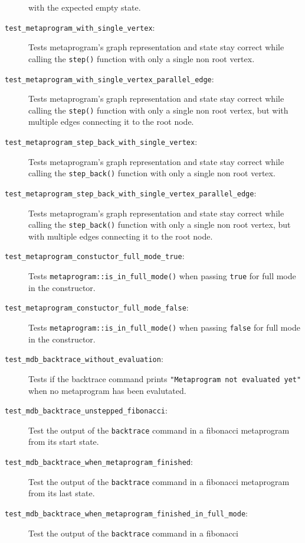 \begin{description}
        with the expected empty state.
    \item[\texttt{test\_metaprogram\_with\_single\_vertex}:]
        Tests metaprogram's graph representation and state stay correct while
        calling the \texttt{step()} function with only a single non root
        vertex.
    \item[\texttt{test\_metaprogram\_with\_single\_vertex\_parallel\_edge}:]
        Tests metaprogram's graph representation and state stay correct while
        calling the \texttt{step()} function with only a single non root
        vertex, but with multiple edges connecting it to the root node.
    \item[\texttt{test\_metaprogram\_step\_back\_with\_single\_vertex}:]
        Tests metaprogram's graph representation and state stay correct while
        calling the \texttt{step\_back()} function with only a single non root
        vertex.
    \item[\texttt{test\_metaprogram\_step\_back\_with\_single\_vertex\_parallel\_edge}:]
        Tests metaprogram's graph representation and state stay correct while
        calling the \texttt{step\_back()} function with only a single non root
        vertex, but with multiple edges connecting it to the root node.
    \item[\texttt{test\_metaprogram\_constuctor\_full\_mode\_true}:]
        Tests \texttt{metaprogram::is\_in\_full\_mode()} when passing
        \texttt{true} for full mode in the constructor.
    \item[\texttt{test\_metaprogram\_constuctor\_full\_mode\_false}:]
        Tests \texttt{metaprogram::is\_in\_full\_mode()} when passing
        \texttt{false} for full mode in the constructor.
    \item[\texttt{test\_mdb\_backtrace\_without\_evaluation}:]
        Tests if the backtrace command prints
        \texttt{"Metaprogram not evaluated yet"} when no metaprogram has been
        evalutated.
    \item[\texttt{test\_mdb\_backtrace\_unstepped\_fibonacci}:]
        Test the output of the \texttt{backtrace} command in a fibonacci
        metaprogram from its start state.
    \item[\texttt{test\_mdb\_backtrace\_when\_metaprogram\_finished}:]
        Test the output of the \texttt{backtrace} command in a fibonacci
        metaprogram from its last state.
    \item[\texttt{test\_mdb\_backtrace\_when\_metaprogram\_finished\_in\_full\_mode}:]
        Test the output of the \texttt{backtrace} command in a fibonacci

\end{description}
